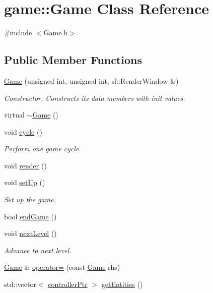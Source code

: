 \hypertarget{classgame_1_1Game}{\section{game\-:\-:\-Game \-Class \-Reference}
\label{db/d26/classgame_1_1Game}
}


{\ttfamily \#include $<$\-Game.\-h$>$}

\subsection*{\-Public \-Member \-Functions}
\begin{DoxyCompactItemize}
\item 
\hyperlink{classgame_1_1Game_a81ee3006adc962b085e3a6edab8b5697}{\-Game} (unsigned int, unsigned int, sf\-::\-Render\-Window \&)
\begin{DoxyCompactList}\small\item\em \-Constructor. \-Constructs its data members with init values. \end{DoxyCompactList}\item 
virtual \hyperlink{classgame_1_1Game_a11533ea74de8e4f1233880b15a08548c}{$\sim$\-Game} ()
\item 
void \hyperlink{classgame_1_1Game_a6dc4f873b9b1c955a0544bca28cc9318}{cycle} ()
\begin{DoxyCompactList}\small\item\em \-Perform one game cycle. \end{DoxyCompactList}\item 
void \hyperlink{classgame_1_1Game_a4aecc19127162535f4b81379f429bc5d}{render} ()
\item 
void \hyperlink{classgame_1_1Game_ac07a017db4fa81abfacb0de6865d666c}{set\-Up} ()
\begin{DoxyCompactList}\small\item\em \-Set up the game. \end{DoxyCompactList}\item 
bool \hyperlink{classgame_1_1Game_acb8fd62635842a917cc852d4cef0f1ec}{end\-Game} ()
\item 
void \hyperlink{classgame_1_1Game_ac90666ebb291630afa5f75c815026c71}{next\-Level} ()
\begin{DoxyCompactList}\small\item\em \-Advance to next level. \end{DoxyCompactList}\item 
\hyperlink{classgame_1_1Game}{\-Game} \& \hyperlink{classgame_1_1Game_aed1d362b92ee12dab2c350d2b5788744}{operator=} (const \hyperlink{classgame_1_1Game}{\-Game} rhs)
\item 
std\-::vector$<$ \hyperlink{Game_8h_a21b04f6cf2d5990b82725fac5ea2ce9a}{controller\-Ptr} $>$ \hyperlink{classgame_1_1Game_a860f35299672854f2a31b4d06b1936d1}{get\-Entities} ()
\end{DoxyCompactItemize}
